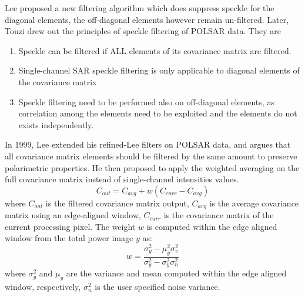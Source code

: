 Lee \cite{Lee_1991_TGRS} proposed a new filtering algorithm which does suppress speckle for the diagonal elements, the off-diagonal elements however remain un-filtered.
Later, Touzi \cite{Touzi_1994_TGRS} drew out the principles of speckle filtering of POLSAR data. 
They are
\begin{enumerate}
	\item Speckle can be filtered if ALL elements of its covariance matrix are filtered.
	\item Single-channel SAR speckle filtering is only applicable to diagonal elements of the covariance matrix
	\item Speckle filtering need to be performed also on off-diagonal elements, as correlation among the elements need to be exploited and the elements do not exists independently.
\end{enumerate}

In 1999, Lee \cite{Lee_1999_TGRS} extended his refined-Lee filters on POLSAR data, and argues that all covariance matrix elements should be filtered by the same amount to preserve polarimetric properties. 
He then proposed to apply the weighted averaging on the full covariance matrix instead of single-channel intensities values. 
\begin{equation}
C_{out} = C_{avg} + w (C_{curr} - C_{avg})
\end{equation}
where
	$C_{out}$ is the filtered covariance matrix output,
	$C_{avg}$ is the average covariance matrix using an edge-aligned window,
	$C_{curr}$ is the covariance matrix of the current processing pixel.
The weight $w$ is computed within the edge aligned window from the total power image $y$ as:
\begin{equation}
w = \frac{\sigma^2_y - \mu^2_y \sigma^2_v}{\sigma^2_y - \sigma^2_y \sigma^2_n}
\end{equation}
where 
	$\sigma^2_y$ and $\mu_y$ are the variance and mean computed within the edge aligned window, respectively,
	$\sigma^2_n$ is the user specified noise variance. 

